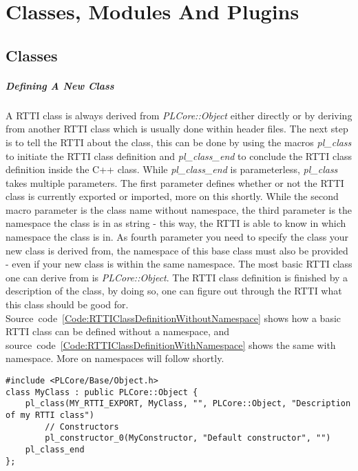 \chapter{Classes, Modules And Plugins}
\label{Chapter:ClassesModulesAndPlugins}



\section{Classes}
\paragraph{Defining A New Class}
A RTTI class is always derived from \emph{PLCore::Object} either directly or by deriving from another RTTI class which is usually done within header files. The next step is to tell the RTTI about the class, this can be done by using the macros \emph{pl\_class} to initiate the RTTI class definition and \emph{pl\_class\_end} to conclude the RTTI class definition inside the C++ class. While \emph{pl\_class\_end} is parameterless, \emph{pl\_class} takes multiple parameters. The first parameter defines whether or not the RTTI class is currently exported or imported, more on this shortly. While the second macro parameter is the class name without namespace, the third parameter is the namespace the class is in as string - this way, the RTTI is able to know in which namespace the class is in. As fourth parameter you need to specify the class your new class is derived from, the namespace of this base class must also be provided - even if your new class is within the same namespace. The most basic RTTI class one can derive from is \emph{PLCore::Object}. The RTTI class definition is finished by a description of the class, by doing so, one can figure out through the RTTI what this class should be good for. Source~code~\ref{Code:RTTIClassDefinitionWithoutNamespace} shows how a basic RTTI class can be defined without a namespace, and source~code~\ref{Code:RTTIClassDefinitionWithNamespace} shows the same with namespace. More on namespaces will follow shortly.
\begin{lstlisting}[float=htb,label=Code:RTTIClassDefinitionWithoutNamespace,caption={Defining a new RTTI class without namespace}]
#include <PLCore/Base/Object.h>
class MyClass : public PLCore::Object {
	pl_class(MY_RTTI_EXPORT, MyClass, "", PLCore::Object, "Description of my RTTI class")
		// Constructors
		pl_constructor_0(MyConstructor, "Default constructor", "")
	pl_class_end
};
\end{lstlisting}
